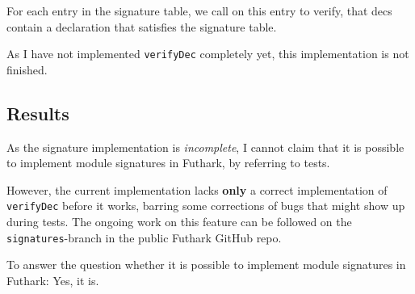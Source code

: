 For each entry in the signature table, we call  on this entry to
verify, that decs contain a declaration that satisfies the signature table.

As I have not implemented \texttt{verifyDec} completely yet, this implementation
is not finished.

\subsection{Results}
As the signature implementation is \textit{incomplete}, I cannot claim that it
is possible to implement module signatures in Futhark, by referring to tests.

However, the current implementation lacks \textbf{only} a correct implementation of
\texttt{verifyDec} before it works, barring some corrections of bugs that might
show up during tests.
The ongoing work on this feature can be followed on the \texttt{signatures}-branch in
the public Futhark GitHub repo.

To answer the question whether it is possible to implement module signatures in
Futhark: Yes, it is. 
